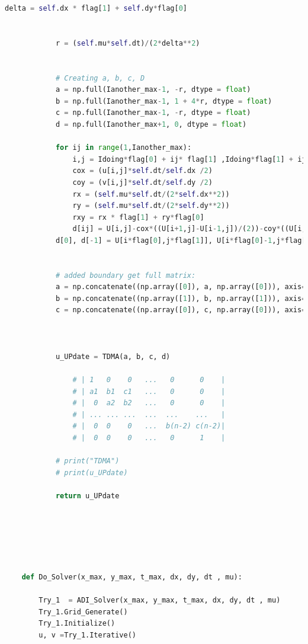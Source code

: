 \documentclass[12pt]{article}
\begin{document}
\begin{scriptsize}
\begin{lstlisting}[language=python,caption={Extended Region using ADI Solver}]
            delta = self.dx * flag[1] + self.dy*flag[0]
    
    
            r = (self.mu*self.dt)/(2*delta**2)
    
    
            # Creating a, b, c, D
            a = np.full(Ianother_max-1, -r, dtype = float)
            b = np.full(Ianother_max-1, 1 + 4*r, dtype = float)
            c = np.full(Ianother_max-1, -r, dtype = float)
            d = np.full(Ianother_max+1, 0, dtype = float)
    
            for ij in range(1,Ianother_max):
                i,j = Idoing*flag[0] + ij* flag[1] ,Idoing*flag[1] + ij* flag[0]
                cox = (u[i,j]*self.dt/self.dx /2)
                coy = (v[i,j]*self.dt/self.dy /2)
                rx = (self.mu*self.dt/(2*self.dx**2))
                ry = (self.mu*self.dt/(2*self.dy**2))
                rxy = rx * flag[1] + ry*flag[0]
                d[ij] = U[i,j]-cox*((U[i+1,j]-U[i-1,j])/(2))-coy*((U[i,j+1]-U[i,j-1])/(2))+rxy*(U[i+flag[0],j+flag[1]]+U[i-flag[0],j-flag[1]])
            d[0], d[-1] = U[i*flag[0],j*flag[1]], U[i*flag[0]-1,j*flag[1]-1]
            
            
            # added boundary get full matrix:
            a = np.concatenate((np.array([0]), a, np.array([0])), axis=0)
            b = np.concatenate((np.array([1]), b, np.array([1])), axis=0)
            c = np.concatenate((np.array([0]), c, np.array([0])), axis=0)
    
    
               
            u_UPdate = TDMA(a, b, c, d)
    
                # | 1   0    0   ...   0      0    |
                # | a1  b1  c1   ...   0      0    |
                # |  0  a2  b2   ...   0      0    |
                # | ... ... ...  ...  ...    ...   |
                # |  0  0    0   ...  b(n-2) c(n-2)|
                # |  0  0    0   ...   0      1    |
            
            # print("TDMA")
            # print(u_UPdate)
    
            return u_UPdate
    
    
    
    
    
    
    def Do_Solver(x_max, y_max, t_max, dx, dy, dt , mu):
         
        Try_1  = ADI_Solver(x_max, y_max, t_max, dx, dy, dt , mu)
        Try_1.Grid_Generate()
        Try_1.Initialize()
        u, v =Try_1.Iterative()
    

\end{lstlisting}
\end{scriptsize}
\end{document}
